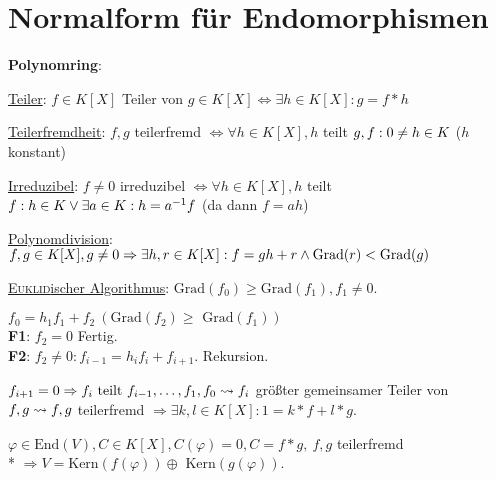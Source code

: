\section{\label{sec:JNF}Normalform für Endomorphismen}

\textbf{Polynomring}:
\begin{items}
	\item \underline{Teiler}: $f \in K[X]$ Teiler von $g \in K[X] \Leftrightarrow \exists h \in K[X]: g=f*h$
	\item \underline{Teilerfremdheit}: $f,g$ teilerfremd $\Leftrightarrow \forall h \in K[X], h$ teilt $g, f: \\* 0 \neq h \in K$ ($h$ konstant)
	\item \underline{Irreduzibel}: $f \neq 0$ irreduzibel $\Leftrightarrow \forall h \in K[X], h$ teilt $f: \\* h \in K \vee \exists a \in K: h = a^{-1}f$ (da dann $f=ah$)
	\item \underline{Polynomdivision}: $f,g \in K[X], g \neq 0 \Rightarrow \exists h,r \in K[X]: \\* f=gh+r \wedge \text{Grad}(r) < \text{Grad}(g)$
	\item \underline{\textsc{Euklid}ischer Algorithmus}: $\text{Grad}(f_0) \geq \text{Grad}(f_1), f_1 \neq 0$.
      \begin{enumeration}
        \item $f_0=h_1f_1+f_2\ (\text{Grad}(f_2)\geq\text{ Grad}(f_1))$ \\
          \textbf{F1}: $f_2=0$ Fertig. \\
          \textbf{F2}: $f_2 \neq 0: f_{i-1} = h_if_i+f_{i+1}$. Rekursion.
        \item $f_{i+1}=0 \Rightarrow f_i \text{ teilt } f_{i-1}, \dots, f_1, f_0 \\* \leadsto f_i$ größter gemeinsamer Teiler von $f,g \\* \leadsto f,g$ teilerfremd $\Rightarrow \exists k,l \in K[X]: 1=k*f+l*g$.
      \end{enumeration}
  	\item $\varphi \in \text{End}(V), C \in K[X], C(\varphi)=0, C=f*g, \ f,g$ teilerfremd \\* $\Rightarrow V=\text{Kern}(f(\varphi))\oplus \text{ Kern}(g(\varphi))$.
\end{items}

